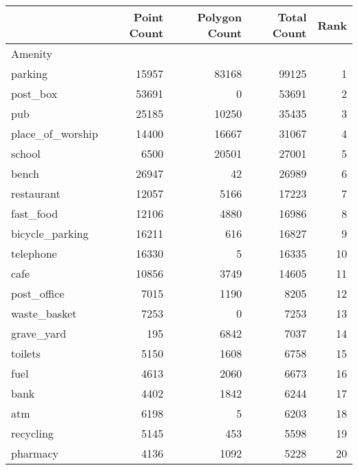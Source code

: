 \begin{tabular}{lrrrr}
\toprule
{} &  Point Count &  Polygon Count &  Total Count &  Rank \\
\midrule
Amenity          &              &                &              &       \\
parking          &        15957 &          83168 &        99125 &     1 \\
post\_box         &        53691 &              0 &        53691 &     2 \\
pub              &        25185 &          10250 &        35435 &     3 \\
place\_of\_worship &        14400 &          16667 &        31067 &     4 \\
school           &         6500 &          20501 &        27001 &     5 \\
bench            &        26947 &             42 &        26989 &     6 \\
restaurant       &        12057 &           5166 &        17223 &     7 \\
fast\_food        &        12106 &           4880 &        16986 &     8 \\
bicycle\_parking  &        16211 &            616 &        16827 &     9 \\
telephone        &        16330 &              5 &        16335 &    10 \\
cafe             &        10856 &           3749 &        14605 &    11 \\
post\_office      &         7015 &           1190 &         8205 &    12 \\
waste\_basket     &         7253 &              0 &         7253 &    13 \\
grave\_yard       &          195 &           6842 &         7037 &    14 \\
toilets          &         5150 &           1608 &         6758 &    15 \\
fuel             &         4613 &           2060 &         6673 &    16 \\
bank             &         4402 &           1842 &         6244 &    17 \\
atm              &         6198 &              5 &         6203 &    18 \\
recycling        &         5145 &            453 &         5598 &    19 \\
pharmacy         &         4136 &           1092 &         5228 &    20 \\

\end{tabular}
